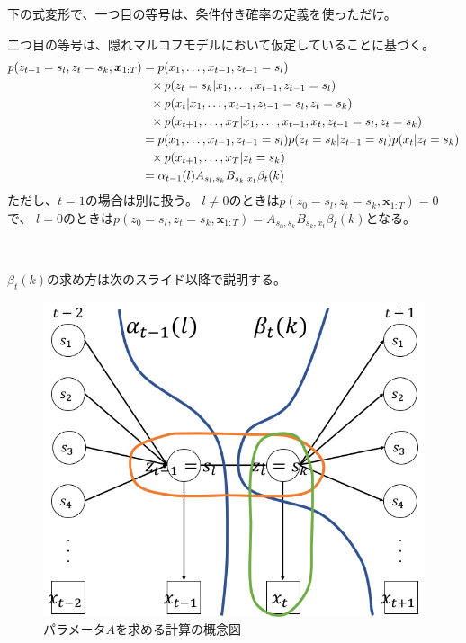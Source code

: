 \documentclass[aspectratio=169,unicode,dvipdfmx,14pt]{beamer}
\begin{document}
\begin{frame}{}
\FontMath
下の式変形で、一つ目の等号は、条件付き確率の定義を使っただけ。

二つ目の等号は、隠れマルコフモデルにおいて仮定していることに基づく。
\begin{align}
p(z_{t-1}=s_l, z_t=s_k, \bm{x}_{1:T})
 &
= p(x_1,\ldots, x_{t-1}, z_{t-1}=s_l) 
\notag \\ & \mbox{ \ } \times
p(z_t=s_k | x_1,\ldots, x_{t-1}, z_{t-1}=s_l)
\notag \\ & \mbox{ \ } \times
p(x_t| x_1,\ldots, x_{t-1}, z_{t-1}=s_l, z_t=s_k )
\notag \\ & \mbox{ \ } \times
p(x_{t+1}, \ldots, x_T | x_1,\ldots, x_{t-1}, x_t, z_{t-1}=s_l, z_t=s_k)
\notag \\ &
= p(x_1,\ldots, x_{t-1}, z_{t-1}=s_l) p(z_t=s_k | z_{t-1}=s_l)
p(x_t| z_t=s_k )
\notag \\ & \mbox{ \ } \times
p(x_{t+1}, \ldots, x_T | z_t=s_k)
\notag \\ &
= \alpha_{t-1}(l) A_{s_l,s_k} B_{s_k,x_t} \beta_t(k)
\end{align}
ただし、$t=1$の場合は別に扱う。
$l\neq 0$のときは$p(z_0=s_l, z_t=s_k, \bm{x}_{1:T})=0$で、
$l = 0$のときは$p(z_0=s_l, z_t=s_k, \bm{x}_{1:T})=A_{s_0,s_k} B_{s_k,x_t} \beta_t(k)$となる。

\

$\beta_t(k)$の求め方は次のスライド以降で説明する。
\end{frame}

\begin{frame}
\begin{figure}[htbp]
\begin{center}
\includegraphics[scale=.38]{HMM_EM.jpg}
\caption{パラメータ$A$を求める計算の概念図}
\label{fig:HMM_A}
\end{center}
\end{figure}
\end{frame}
\end{document}

